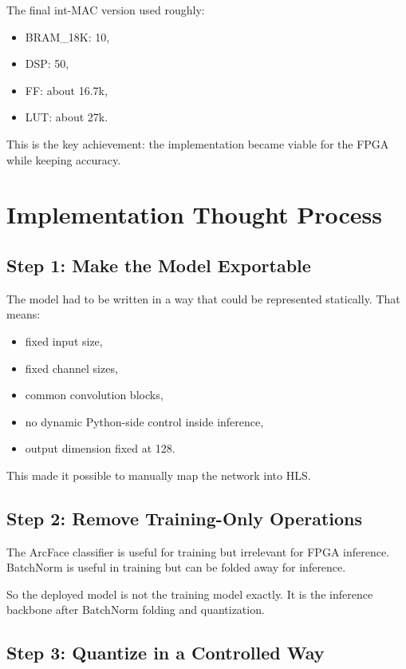 \documentclass[11pt]{article}
\begin{document}
The final int-MAC version used roughly:

\begin{itemize}[leftmargin=1.4em]
  \item BRAM\_18K: 10,
  \item DSP: 50,
  \item FF: about 16.7k,
  \item LUT: about 27k.
\end{itemize}

This is the key achievement:
the implementation became viable for the FPGA while keeping accuracy.

\section{Implementation Thought Process}

\subsection{Step 1: Make the Model Exportable}

The model had to be written in a way that could be represented statically.
That means:

\begin{itemize}[leftmargin=1.4em]
  \item fixed input size,
  \item fixed channel sizes,
  \item common convolution blocks,
  \item no dynamic Python-side control inside inference,
  \item output dimension fixed at 128.
\end{itemize}

This made it possible to manually map the network into HLS.

\subsection{Step 2: Remove Training-Only Operations}

The ArcFace classifier is useful for training but irrelevant for FPGA inference.
BatchNorm is useful in training but can be folded away for inference.

So the deployed model is not the training model exactly.
It is the inference backbone after BatchNorm folding and quantization.

\subsection{Step 3: Quantize in a Controlled Way}
\end{document}
